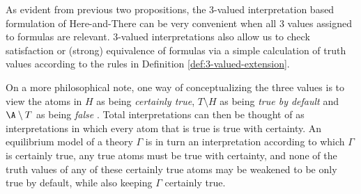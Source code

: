As evident from previous two propositions, the 3-valued interpretation
based formulation of Here-and-There can be very convenient when all 3
values assigned to formulas are relevant. 3-valued interpretations
also allow us to check satisfaction or (strong) equivalence of
formulas via a simple calculation of truth values according to the
rules in Definition \ref{def:3-valued-extension}.

On a more philosophical note, one way of conceptualizing the three
values is to view the atoms in $H$ as being \textit{certainly true},
$T \setminus H$ as being \textit{true by default} and $\A \setminus T$
as being \textit{false} \cite{capeva17a}. Total interpretations can
then be thought of as interpretations in which every atom that is true
is true with certainty. An equilibrium model of a theory $\Gamma$ is in
turn an interpretation according to which $\Gamma$ is certainly true,
any true atoms must be true with certainty, and none of the truth
values of any of these certainly true atoms may be weakened to be only
true by default, while also keeping $\Gamma$ certainly true.
